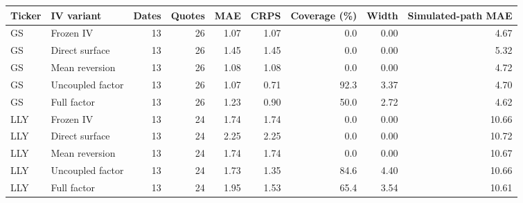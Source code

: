 \begin{tabular}{llrrrrrrr}
\toprule
Ticker & IV variant & Dates & Quotes & MAE & CRPS & Coverage (\%) & Width & Simulated-path MAE \\
\midrule
GS & Frozen IV & 13 & 26 & 1.07 & 1.07 & 0.0 & 0.00 & 4.67 \\
GS & Direct surface & 13 & 26 & 1.45 & 1.45 & 0.0 & 0.00 & 5.32 \\
GS & Mean reversion & 13 & 26 & 1.08 & 1.08 & 0.0 & 0.00 & 4.72 \\
GS & Uncoupled factor & 13 & 26 & 1.07 & 0.71 & 92.3 & 3.37 & 4.70 \\
GS & Full factor & 13 & 26 & 1.23 & 0.90 & 50.0 & 2.72 & 4.62 \\
LLY & Frozen IV & 13 & 24 & 1.74 & 1.74 & 0.0 & 0.00 & 10.66 \\
LLY & Direct surface & 13 & 24 & 2.25 & 2.25 & 0.0 & 0.00 & 10.72 \\
LLY & Mean reversion & 13 & 24 & 1.74 & 1.74 & 0.0 & 0.00 & 10.67 \\
LLY & Uncoupled factor & 13 & 24 & 1.73 & 1.35 & 84.6 & 4.40 & 10.66 \\
LLY & Full factor & 13 & 24 & 1.95 & 1.53 & 65.4 & 3.54 & 10.61 \\
\bottomrule\end{tabular}
